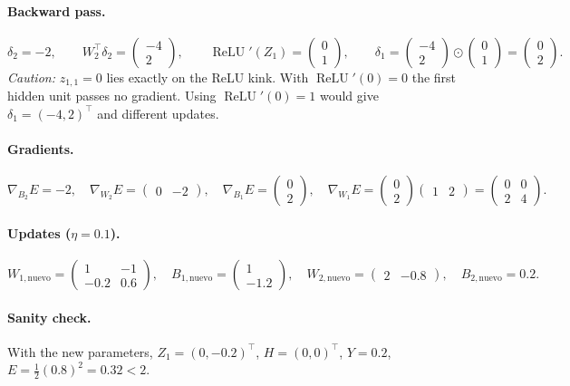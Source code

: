 \documentclass[11pt,a4paper]{article}
\newcommand{\relu}{\operatorname{ReLU}}
\begin{document}
{\paragraph{Backward pass.}
\[
\delta_2=-2,\qquad
W_2^{\top}\delta_2=\begin{pmatrix}-4\\2\end{pmatrix},\qquad
\relu'(Z_1)=\begin{pmatrix}0\\1\end{pmatrix},\qquad
\delta_1=\begin{pmatrix}-4\\2\end{pmatrix}\odot\begin{pmatrix}0\\1\end{pmatrix}=\begin{pmatrix}0\\2\end{pmatrix}.
\]
\emph{Caution:} $z_{1,1}=0$ lies exactly on the ReLU kink. With $\relu'(0)=0$ the first hidden unit passes
no gradient. Using $\relu'(0)=1$ would give $\delta_1=(-4,2)^{\top}$ and different updates.

\paragraph{Gradients.}
\[
\nabla_{B_2}E=-2,\quad
\nabla_{W_2}E=\begin{pmatrix}0&-2\end{pmatrix},\quad
\nabla_{B_1}E=\begin{pmatrix}0\\2\end{pmatrix},\quad
\nabla_{W_1}E=\begin{pmatrix}0\\2\end{pmatrix}\begin{pmatrix}1&2\end{pmatrix}=\begin{pmatrix}0&0\\2&4\end{pmatrix}.
\]

\paragraph{Updates ($\eta=0.1$).}
\[
W_{1,\text{nuevo}}=\begin{pmatrix}1&-1\\-0.2&0.6\end{pmatrix},\quad
B_{1,\text{nuevo}}=\begin{pmatrix}1\\-1.2\end{pmatrix},\quad
W_{2,\text{nuevo}}=\begin{pmatrix}2&-0.8\end{pmatrix},\quad
B_{2,\text{nuevo}}=0.2 .
\]

\paragraph{Sanity check.}
With the new parameters, $Z_1=(0,-0.2)^{\top}$, $H=(0,0)^{\top}$, $Y=0.2$, $E=\tfrac12(0.8)^2=0.32<2$.
}
\end{document}

